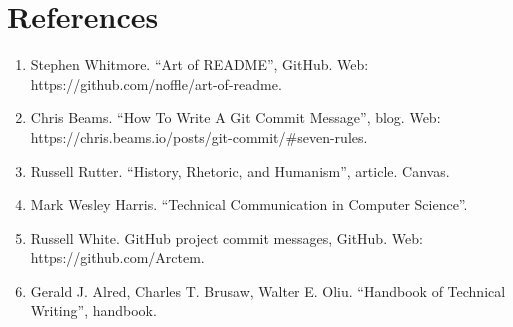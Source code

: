 \documentclass[11pt, twocolumn]{article}
\begin{document}
\section{References}
\label{ref:references}
\begin{enumerate}
\item Stephen Whitmore. ``Art of README'', GitHub. Web: https://github.com/noffle/art-of-readme.
\item Chris Beams. ``How To Write A Git Commit Message'', blog. Web: https://chris.beams.io/posts/git-commit/\#seven-rules.
\item Russell Rutter. ``History, Rhetoric, and Humanism'', article. Canvas.
\item Mark Wesley Harris. ``Technical Communication in Computer Science''.
\item Russell White. GitHub project commit messages, GitHub. Web: https://github.com/Arctem.
\item Gerald J. Alred, Charles T. Brusaw, Walter E. Oliu. ``Handbook of Technical Writing'', handbook.
\end{enumerate}
\end{document}
